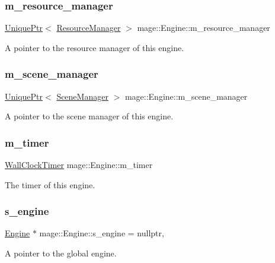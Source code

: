 \subsubsection{\texorpdfstring{m\+\_\+resource\+\_\+manager}{m\_resource\_manager}}
{\footnotesize\ttfamily \hyperlink{namespacemage_a3316d7143a973e37adf1110f2e80ca31}{Unique\+Ptr}$<$ \hyperlink{classmage_1_1_resource_manager}{Resource\+Manager} $>$ mage\+::\+Engine\+::m\+\_\+resource\+\_\+manager\hspace{0.3cm}{\ttfamily [private]}}

A pointer to the resource manager of this engine. \hypertarget{classmage_1_1_engine_afac8085ae572d623e77b1e0847440ab4}{}\label{classmage_1_1_engine_afac8085ae572d623e77b1e0847440ab4} 
\subsubsection{\texorpdfstring{m\+\_\+scene\+\_\+manager}{m\_scene\_manager}}
{\footnotesize\ttfamily \hyperlink{namespacemage_a3316d7143a973e37adf1110f2e80ca31}{Unique\+Ptr}$<$ \hyperlink{classmage_1_1_scene_manager}{Scene\+Manager} $>$ mage\+::\+Engine\+::m\+\_\+scene\+\_\+manager\hspace{0.3cm}{\ttfamily [private]}}

A pointer to the scene manager of this engine. \hypertarget{classmage_1_1_engine_a539cff5bf8252ef28b994be49e9e6b7c}{}\label{classmage_1_1_engine_a539cff5bf8252ef28b994be49e9e6b7c} 
\subsubsection{\texorpdfstring{m\+\_\+timer}{m\_timer}}
{\footnotesize\ttfamily \hyperlink{namespacemage_a06f4035ef59f07892e594bf1178a108a}{Wall\+Clock\+Timer} mage\+::\+Engine\+::m\+\_\+timer\hspace{0.3cm}{\ttfamily [private]}}

The timer of this engine. \hypertarget{classmage_1_1_engine_a95fd10c9b9dfe0fc9cbbcb441c910240}{}\label{classmage_1_1_engine_a95fd10c9b9dfe0fc9cbbcb441c910240} 
\subsubsection{\texorpdfstring{s\+\_\+engine}{s\_engine}}
{\footnotesize\ttfamily \hyperlink{classmage_1_1_engine}{Engine} $\ast$ mage\+::\+Engine\+::s\+\_\+engine = nullptr\hspace{0.3cm}{\ttfamily [static]}, {\ttfamily [private]}}

A pointer to the global engine. 